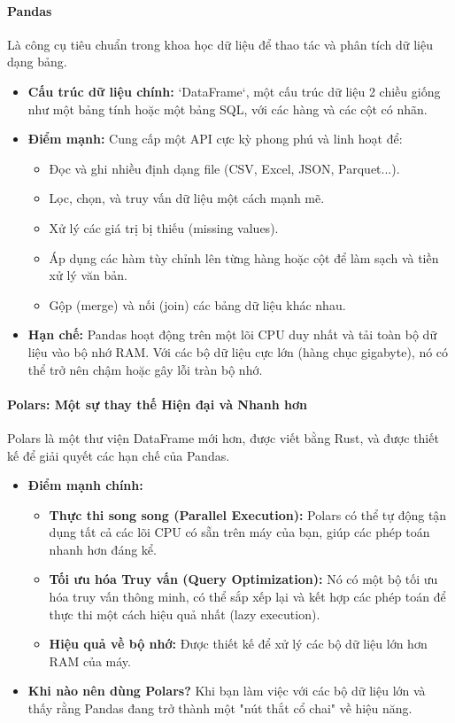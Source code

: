\paragraph{Pandas}
Là công cụ tiêu chuẩn trong khoa học dữ liệu để thao tác và phân tích dữ liệu dạng bảng.
\begin{itemize}
    \item \textbf{Cấu trúc dữ liệu chính:} `DataFrame`, một cấu trúc dữ liệu 2 chiều giống như một bảng tính hoặc một bảng SQL, với các hàng và các cột có nhãn.
    \item \textbf{Điểm mạnh:} Cung cấp một API cực kỳ phong phú và linh hoạt để:
        \begin{itemize}
            \item Đọc và ghi nhiều định dạng file (CSV, Excel, JSON, Parquet...).
            \item Lọc, chọn, và truy vấn dữ liệu một cách mạnh mẽ.
            \item Xử lý các giá trị bị thiếu (missing values).
            \item Áp dụng các hàm tùy chỉnh lên từng hàng hoặc cột để làm sạch và tiền xử lý văn bản.
            \item Gộp (merge) và nối (join) các bảng dữ liệu khác nhau.
        \end{itemize}
    \item \textbf{Hạn chế:} Pandas hoạt động trên một lõi CPU duy nhất và tải toàn bộ dữ liệu vào bộ nhớ RAM. Với các bộ dữ liệu cực lớn (hàng chục gigabyte), nó có thể trở nên chậm hoặc gây lỗi tràn bộ nhớ.
\end{itemize}

\paragraph{Polars: Một sự thay thế Hiện đại và Nhanh hơn}
Polars là một thư viện DataFrame mới hơn, được viết bằng Rust, và được thiết kế để giải quyết các hạn chế của Pandas.
\begin{itemize}
    \item \textbf{Điểm mạnh chính:}
        \begin{itemize}
            \item \textbf{Thực thi song song (Parallel Execution):} Polars có thể tự động tận dụng tất cả các lõi CPU có sẵn trên máy của bạn, giúp các phép toán nhanh hơn đáng kể.
            \item \textbf{Tối ưu hóa Truy vấn (Query Optimization):} Nó có một bộ tối ưu hóa truy vấn thông minh, có thể sắp xếp lại và kết hợp các phép toán để thực thi một cách hiệu quả nhất (lazy execution).
            \item \textbf{Hiệu quả về bộ nhớ:} Được thiết kế để xử lý các bộ dữ liệu lớn hơn RAM của máy.
        \end{itemize}
    \item \textbf{Khi nào nên dùng Polars?} Khi bạn làm việc với các bộ dữ liệu lớn và thấy rằng Pandas đang trở thành một "nút thắt cổ chai" về hiệu năng.
\end{itemize}

